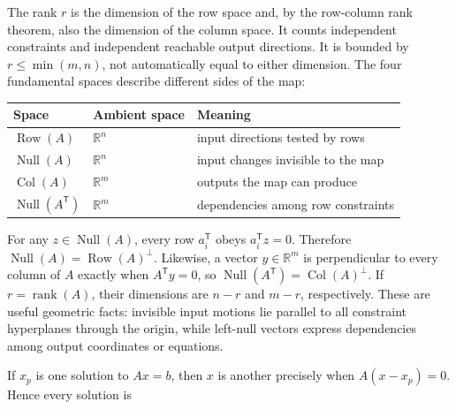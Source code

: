 The rank \(r\) is the dimension of the row space and, by the row-column rank theorem, also the dimension of the column space. It counts independent constraints and independent reachable output directions. It is bounded by \(r\le\min(m,n)\), not automatically equal to either dimension. The four fundamental spaces describe different sides of the map:

{\def\LTcaptype{none} %
\begin{longtable}[]{@{}
  >{\raggedright\arraybackslash}p{}
  >{\raggedleft\arraybackslash}p{}
  >{\raggedright\arraybackslash}p{}@{}}
\toprule\noalign{}
\begin{minipage}[b]{\linewidth}\raggedright
Space
\end{minipage} & \begin{minipage}[b]{\linewidth}\raggedleft
Ambient space
\end{minipage} & \begin{minipage}[b]{\linewidth}\raggedright
Meaning
\end{minipage} \\
\midrule\noalign{}
\endhead
\bottomrule\noalign{}
\endlastfoot
\(\operatorname{Row}(A)\) & \(\mathbb R^n\) & input directions tested by rows \\
\(\operatorname{Null}(A)\) & \(\mathbb R^n\) & input changes invisible to the map \\
\(\operatorname{Col}(A)\) & \(\mathbb R^m\) & outputs the map can produce \\
\(\operatorname{Null}(A^\mathsf T)\) & \(\mathbb R^m\) & dependencies among row constraints \\
\end{longtable}
}

For any \(z\in\operatorname{Null}(A)\), every row \(a_i^\mathsf T\) obeys \(a_i^\mathsf Tz=0\). Therefore \(\operatorname{Null}(A)=\operatorname{Row}(A)^\perp\). Likewise, a vector \(y\in\mathbb R^m\) is perpendicular to every column of \(A\) exactly when \(A^\mathsf Ty=0\), so \(\operatorname{Null}(A^\mathsf T)=\operatorname{Col}(A)^\perp\). If \(r=\operatorname{rank}(A)\), their dimensions are \(n-r\) and \(m-r\), respectively. These are useful geometric facts: invisible input motions lie parallel to all constraint hyperplanes through the origin, while left-null vectors express dependencies among output coordinates or equations.

If \(x_p\) is one solution to \(Ax=b\), then \(x\) is another precisely when \(A(x-x_p)=0\). Hence every solution is

